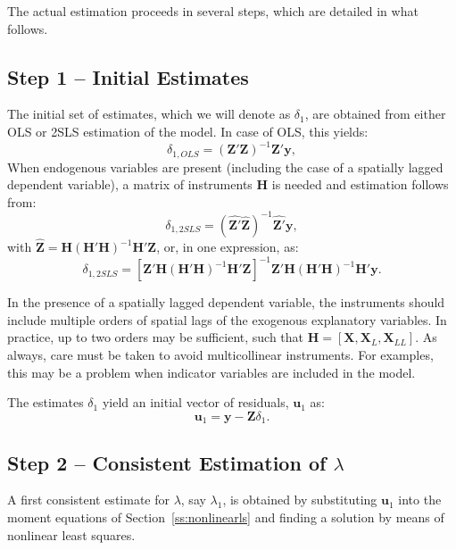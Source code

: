 \documentclass{article}
\begin{document}
The actual estimation proceeds in several steps, which are detailed in what follows.

\subsection{Step 1 -- Initial Estimates}\label{ss:initial}
The initial set of estimates, which we will denote as $\delta_1$, are obtained from
either OLS or 2SLS estimation of the model. In case of OLS, this yields:
\begin{equation*}
\delta_{1,OLS} = (\mathbf{Z'Z})^{-1} \mathbf{Z'y},
\end{equation*}
When endogenous variables are present (including the case of a spatially lagged
dependent variable), a matrix of instruments $\mathbf{H}$ is needed and 
estimation follows from:
\begin{equation*}
\delta_{1,2SLS} = (\hat{\mathbf{Z'}} \hat{\mathbf{Z}} )^{-1} \hat{\mathbf{Z'}} \mathbf{y},
\end{equation*}
with $\hat{\mathbf{Z}} = \mathbf{H} (\mathbf{H'H} )^{-1} \mathbf{H'Z}$, or, in one expression, as:
\begin{equation*}
\delta_{1,2SLS} = [ \mathbf{Z'H} (\mathbf{H'H})^{-1} \mathbf{H'Z} ]^{-1} \mathbf{Z'H} (\mathbf{H'H})^{-1} \mathbf{H'} \mathbf{y}.
\end{equation*}

In the presence of a spatially lagged dependent variable, the instruments should 
include multiple orders of spatial lags of the exogenous explanatory variables.
In practice, up to two orders may be sufficient, such that $\mathbf{H} = [ \mathbf{X},
\mathbf{X}_L, \mathbf{X}_{LL} ]$. As always, care must be taken to avoid multicollinear
instruments. For examples, this may be a problem when indicator variables are
included in the model.

The estimates $\delta_1$ yield an initial vector of residuals, $\mathbf{u}_1$ as:
\begin{equation*}
\mathbf{u}_1 = \mathbf{y} - \mathbf{Z} \delta_1.
\end{equation*}

\subsection{Step 2 -- Consistent Estimation of $\lambda$}
A first consistent estimate for $\lambda$, say $\lambda_1$, is obtained
by substituting $\mathbf{u}_1$ into the moment equations of Section~\ref{ss:nonlinearls}
and finding a solution by means of nonlinear least squares.
\end{document}
